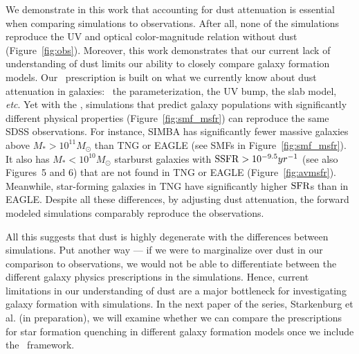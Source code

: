 We demonstrate in this work that accounting for dust attenuation is
essential when comparing simulations to observations. 
After all, none of the simulations reproduce the UV and optical
color-magnitude relation without dust (Figure~\ref{fig:obs}). 
Moreover, this work demonstrates that our current lack of 
understanding of dust limits our ability to closely compare galaxy
formation models. 
Our \eda~prescription is built on what we currently know about dust attenuation
in galaxies: \eg~the \citealt{noll2009} parameterization, the UV bump, the slab
model, \emph{etc}.
Yet with the \eda, simulations that predict galaxy populations with
significantly different physical properties (Figure~\ref{fig:smf_msfr}) can
reproduce the same SDSS observations. 
For instance, SIMBA has significantly fewer massive galaxies above $M_* >
10^{11}M_\odot$ than TNG or EAGLE (see SMFs in Figure~\ref{fig:smf_msfr}). 
It also has $M_* < 10^{10}M_\odot$ starburst galaxies with ${\rm SSFR} >
10^{-9.5}yr^{-1}$ (see also \citealt{dave2019} Figures~5 and 6)
that are not found in TNG or EAGLE (Figure~\ref{fig:avmsfr}). 
Meanwhile, star-forming galaxies in TNG have significantly higher ${\rm SFR}$s than
in EAGLE.
Despite all these differences, by adjusting dust attenuation, the forward
modeled simulations comparably reproduce the observations.

All this suggests that dust is highly degenerate with the differences between simulations. 
Put another way --- if we were to marginalize over dust in our comparison to
observations, we would not be able to differentiate between the different
galaxy physics prescriptions in the simulations. 
Hence, current limitations in our understanding of dust are a major bottleneck
for investigating galaxy formation with simulations.
In the next paper of the series, Starkenburg et al. (in preparation), we
will examine whether we can compare the prescriptions for star formation
quenching in different galaxy formation models once we include the
\eda~framework.



